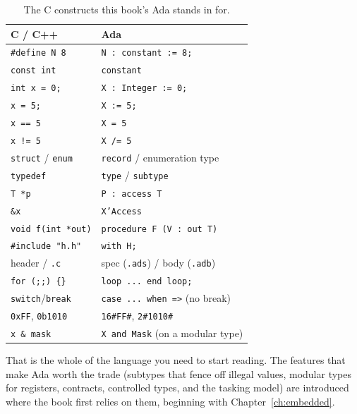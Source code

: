 \begin{table}[ht]
\centering
\begin{tabular}{@{}ll@{}}
\toprule
\textbf{C / C++} & \textbf{Ada} \\
\midrule
\texttt{\#define N 8}          & \texttt{N : constant := 8;} \\
\texttt{const int}             & \texttt{constant} \\
\texttt{int x = 0;}            & \texttt{X : Integer := 0;} \\
\texttt{x = 5;}                & \texttt{X := 5;} \\
\texttt{x == 5}                & \texttt{X = 5} \\
\texttt{x != 5}                & \texttt{X /= 5} \\
\texttt{struct} / \texttt{enum} & \texttt{record} / enumeration type \\
\texttt{typedef}              & \texttt{type} / \texttt{subtype} \\
\texttt{T *p}                 & \texttt{P : access T} \\
\texttt{\&x}                   & \texttt{X'Access} \\
\texttt{void f(int *out)}     & \texttt{procedure F (V : out T)} \\
\texttt{\#include "h.h"}       & \texttt{with H;} \\
header / \texttt{.c}          & spec (\texttt{.ads}) / body (\texttt{.adb}) \\
\texttt{for (;;) \{\}}         & \texttt{loop ... end loop;} \\
\texttt{switch}/\texttt{break} & \texttt{case ... when =>} (no break) \\
\texttt{0xFF}, \texttt{0b1010} & \texttt{16\#FF\#}, \texttt{2\#1010\#} \\
\texttt{x \& mask}            & \texttt{X and Mask} (on a modular type) \\
\bottomrule
\end{tabular}
\caption{The C constructs this book's Ada stands in for.}
\end{table}

That is the whole of the language you need to start reading. The features that make
Ada worth the trade (subtypes that fence off illegal values, modular types for
registers, contracts, controlled types, and the tasking model) are introduced
where the book first relies on them, beginning with Chapter~\ref{ch:embedded}.

